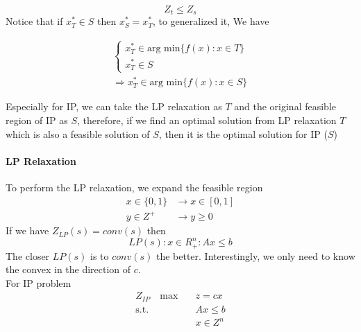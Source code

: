                     \begin{equation*}Z_t \le Z_s  \end{equation*}
                    Notice that if $x_T^* \in S$ then $x_S^*=x_T^*$, to generalized it, We have

                    \begin{align*}
                        \begin{cases}x_T^* \in \text{arg min} \{f(x): x\in T\} \\ x_T^* \in S\end{cases} \\ \Rightarrow x_T^*\in \text{arg min} \{f(x): x\in S\} 
                    \end{align*}

                    Especially for IP, we can take the LP relaxation as $T$ and the original feasible region of IP as $S$, therefore, if we find an optimal solution from LP relaxation $T$ which is also a feasible solution of $S$, then it is the optimal solution for IP ($S$)
                    
                \paragraph{LP Relaxation}
                    To perform the LP relaxation, we expand the feasible region
                    \begin{align*}
                        x \in \{0,1\} & \rightarrow x\in [0, 1]  \\
                        y\in Z^+ & \rightarrow y \ge 0 
                    \end{align*}
                    If we have $Z_{LP}(s) = conv(s)$ then
                    \begin{equation*} LP(s): {x\in R_+^n: Ax\le b}\end{equation*}
                    The closer $LP(s)$ is to $conv(s)$ the better. Interestingly, we only need to know the convex in the direction of $c$.\\

                    For IP problem
                    \begin{align*}
                        Z_{IP} \quad \text{max} \quad &z = cx  \\
                                \text{s.t.} &Ax \le b \\
                                        &x\in {Z^n} 
                    \end{align*}

